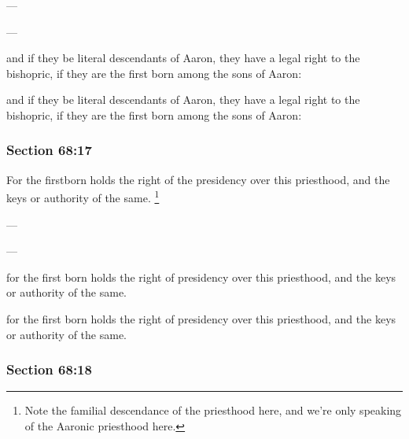 		\begin{framed}
		\scriptsize
			\begin{compactdesc}
				\item[JSP] ---
				\item[EMS] ---
				\item[EMS-R] and if they be literal descendants of Aaron, they have a legal right to the bishopric, if they are the first born among the sons of Aaron:
				\item[DC 1835] and if they be literal descendants of Aaron, they have a legal right to the bishopric, if they are the first born among the sons of Aaron:
			\end{compactdesc}
		\end{framed}

	\subsubsection{Section 68:17} %
		\label{DC68-17}

		For the firstborn holds the right of the presidency over this priesthood, and the keys or authority of the same.%
			\footnote{%
				Note the familial descendance of the priesthood here, and we're only speaking of the Aaronic priesthood here.
				}

		\begin{framed}
		\scriptsize
			\begin{compactdesc}
				\item[JSP] ---
				\item[EMS] ---
				\item[EMS-R] for the first born holds the right of presidency over this priesthood, and the keys or authority of the same.
				\item[DC 1835] for the first born holds the right of presidency over this priesthood, and the keys or authority of the same.
			\end{compactdesc}
		\end{framed}

	\subsubsection{Section 68:18} %
		\label{DC68-18}

